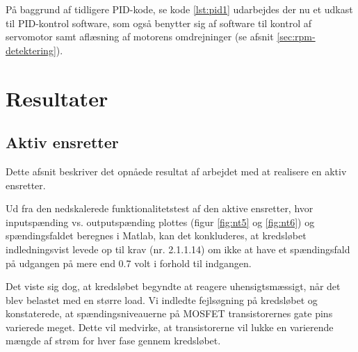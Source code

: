 På baggrund af tidligere PID-kode, se kode \ref{lst:pid1} udarbejdes der nu et udkast til PID-kontrol software, som også benytter sig af software til kontrol af servomotor samt aflæsning af motorens omdrejninger (se afsnit \ref{sec:rpm-detektering}).

  




\clearpage
\chapter{Resultater}
\label{sec:resultater}

\section{Aktiv ensretter}
\label{sec:aktiv-ensretter}

Dette afsnit beskriver det opnåede resultat af arbejdet med at realisere en aktiv ensretter. 

Ud fra den nedskalerede funktionalitetstest af den aktive ensretter, hvor inputspænding vs. outputspænding plottes (figur \ref{fig:nt5} og \ref{fig:nt6}) og spændingsfaldet beregnes i Matlab, kan det konkluderes, at kredsløbet indledningsvist levede op til krav (nr. 2.1.1.14) om ikke at have et spændingsfald på udgangen på mere end 0.7 volt i forhold til indgangen.  

Det viste sig dog, at kredsløbet begyndte at reagere uhensigtsmæssigt, når det blev belastet med en større load. Vi indledte fejlsøgning på kredsløbet og konstaterede, at spændingsniveauerne på MOSFET transistorernes gate pins varierede meget. Dette vil medvirke, at transistorerne vil lukke en varierende mængde af strøm for hver fase gennem kredsløbet. 

